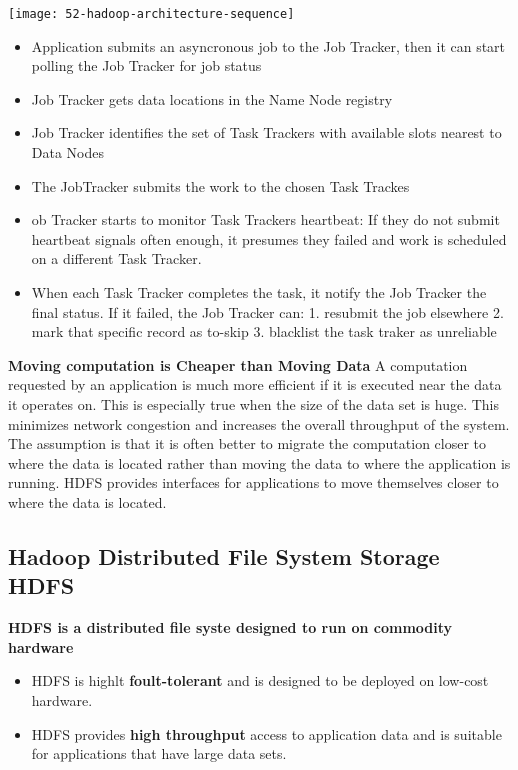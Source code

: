 \begin{center}
\texttt{[image: 52-hadoop-architecture-sequence]}
\end{center}

\begin{itemize}
	\item Application submits an asyncronous job to the Job Tracker, then it can start polling the Job Tracker for job status
	\item Job Tracker gets data locations in the Name Node registry
	\item Job Tracker identifies the set of Task Trackers with available slots nearest to Data Nodes
	\item The JobTracker submits the work to the chosen Task Trackes
	\item ob Tracker starts to monitor Task Trackers heartbeat: If they do not submit heartbeat signals often enough, it presumes they failed and work is scheduled on a different Task Tracker.
	\item When each Task Tracker completes the task, it notify the Job Tracker the final status. If it failed, the Job Tracker can:
	1. resubmit the job elsewhere
	2. mark that specific record as to-skip
	3. blacklist the task traker as unreliable
\end{itemize}

\textbf{Moving computation is Cheaper than Moving Data}
A computation requested by an application is much more efficient if it is executed near the data it operates on. This is especially true when the size of the data set is huge. This minimizes network congestion and increases the overall throughput of the system. The assumption is that it is often better to migrate the computation closer to where the data is located rather than moving the data to where the application is running. HDFS provides interfaces for applications to move themselves closer to where the data is located.

\subsection{Hadoop Distributed File System Storage HDFS}

\textbf{HDFS is a distributed file syste designed to run on commodity hardware}

\begin{itemize}
	\item HDFS is highlt \textbf{foult-tolerant} and is designed to be deployed on low-cost hardware.
	\item HDFS provides \textbf{high throughput} access to application data and is suitable for applications that have large data sets.
\end{itemize}

